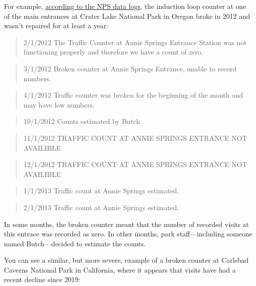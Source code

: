 \documentclass[
  letterpaper,
  DIV=11,
  numbers=noendperiod]{scrartcl}
\begin{document}
For example,
\href{https://irma.nps.gov/Stats/SSRSReports/Park\%20Specific\%20Reports/Monthly\%20Visitation\%20Comments\%20By\%20Park?Park=CRLA}{according
to the NPS data logs}, the induction loop counter at one of the main
entrances at Crater Lake National Park in Oregon broke in 2012 and
wasn't repaired for at least a year:

\begin{quote}
2/1/2012 \textbar{} The Traffic Counter at Annie Springs Entrance
Station was not functioning properly and therefore we have a count of
zero.
\end{quote}

\begin{quote}
3/1/2012 \textbar{} Broken counter at Annie Springs Entrance, unable to
record numbers.
\end{quote}

\begin{quote}
4/1/2012 \textbar{} Traffic counter was broken for the beginning of the
month and may have low numbers.
\end{quote}

\begin{quote}
10/1/2012 \textbar{} Counts estimated by Butch
\end{quote}

\begin{quote}
11/1/2012 \textbar{} TRAFFIC COUNT AT ANNIE SPRINGS ENTRANCE NOT
AVAILIBLE
\end{quote}

\begin{quote}
12/1/2012 \textbar{} TRAFFIC COUNT AT ANNIE SPRINGS ENTRANCE NOT
AVAILIBLE
\end{quote}

\begin{quote}
1/1/2013 \textbar{} Traffic count at Annie Springs estimated.
\end{quote}

\begin{quote}
2/1/2013 \textbar{} Traffic count at Annie Springs estimated.
\end{quote}

In some months, the broken counter meant that the number of recorded
visits at this entrace was recorded as zero. In other months, park
staff---including someone named Butch---decided to estimate the counts.

You can see a similar, but more severe, example of a broken counter at
Carlsbad Caverns National Park in California, where it appears that
visits have had a recent decline since 2019:
\end{document}
